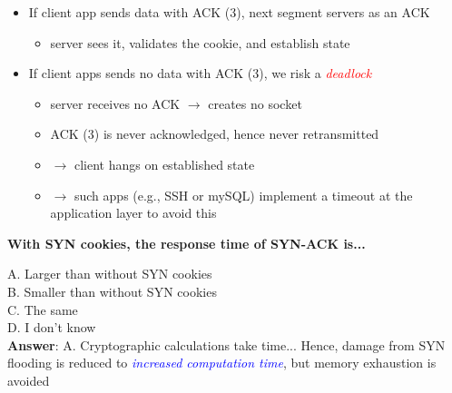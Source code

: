 \documentclass[11pt]{article}
\begin{document}
\begin{itemize}
	\item If client app sends data with ACK (3), next segment servers as an ACK
		\begin{itemize}
			\item server sees it, validates the cookie, and establish state
		\end{itemize}
	\item If client apps sends no data with ACK (3), we risk a \textcolor{red}{\textit{deadlock}}
		\begin{itemize}
			\item server receives no ACK $\rightarrow$ creates no socket
			\item ACK (3) is never acknowledged, hence never retransmitted
			\item $\rightarrow$ client hangs on established state
			\item $\rightarrow$ such apps (e.g., SSH or mySQL) implement a timeout at the application layer to avoid this
		\end{itemize}
\end{itemize}

\begin{tcolorbox}[
  colback=gray!15,     %
  colframe=black!50,    %
  boxrule=1pt,       %
  arc=3mm,             %
  left=4mm, right=4mm, top=2mm, bottom=2mm %
]
\textbf{With SYN cookies, the response time of SYN-ACK is...}

\vspace{0.3cm}

A. Larger than without SYN cookies \\
B. Smaller than without SYN cookies \\
C. The same \\
D. I don't know \\

\textbf{Answer}: A. Cryptographic calculations take time... Hence, damage from SYN flooding is reduced to \textcolor{blue}{\textit{increased computation time}}, but memory exhaustion is avoided
\end{tcolorbox}
\end{document}
